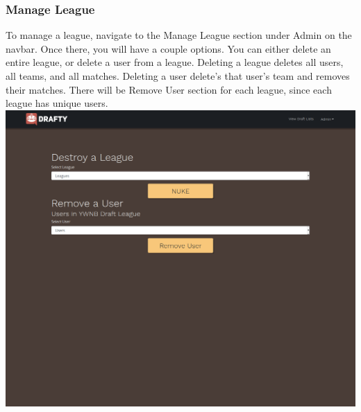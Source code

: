 \documentclass{article}
\begin{document}
  \subsubsection*{Manage League}
  To manage a league, navigate to the Manage League section under Admin on the navbar. Once there, you will have a couple options.
  You can either delete an entire league, or delete a user from a league. Deleting a league deletes all users, all teams, and all matches. 
  Deleting a user delete's that user's team and removes their matches.
  There will be Remove User section for each league, since each league has unique users. \\
  \includegraphics[scale=.3]{manage_league.png}
\end{document}

